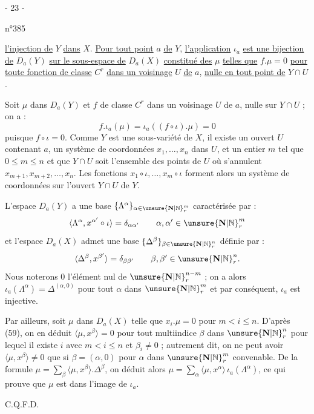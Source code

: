 \begin{center}- 23 -\end{center}
\begin{flushright}n°385\end{flushright}

\uline{l'injection de} $Y$ \uline{dans} $X$. \uline{Pour tout point} $a$ \uline{de} $Y$, \uline{l'application} $\iota_a$ \uline{est une bijection de} $D_a(Y)$ \uline{sur le sous-espace de} $D_a(X)$ \uline{constitué des} $\mu$ \uline{telles que} $f.\mu=0$ \uline{pour toute fonction de classe} $C^r$ \uline{dans un voisinage} $U$ \uline{de} $a$, \uline{nulle en tout point de} $Y\cap U$.

Soit $\mu$ dans $D_a(Y)$ et $f$ de classe $C^r$ dans un voisinage $U$ de $a$, nulle sur $Y\cap U$ ; on a :
\[
f.\iota_a(\mu)=\iota_a((f\circ\iota).\mu)=0
\]
puisque $f\circ\iota=0$. Comme $Y$ est une sous-variété de $X$, il existe un ouvert $U$ contenant $a$, un système de coordonnées $x_1,\ldots,x_n$ dans $U$, et un entier $m$ tel que $0\leq m\leq n$ et que $Y\cap U$ soit l'ensemble des points de $U$ où s'annulent $x_{m+1},x_{m+2},\ldots,x_n$. Les fonctions $x_1\circ\iota,\ldots,x_m\circ\iota$ forment alors un système de coordonnées sur l'ouvert $Y\cap U$ de $Y$.

L'espace $D_a(Y)$ a une base $\{\Lambda^\alpha\}_{\alpha\in\unsure{\mathbf{N}|\mathbb{N}}_r^m}$ caractérisée par :
\[
\langle\Lambda^\alpha,x^{\alpha'}\circ\iota\rangle=\delta_{\alpha\alpha'}
\qquad \alpha,\alpha'\in\unsure{\mathbf{N}|\mathbb{N}}_r^m
\]
et l'espace $D_a(X)$ admet une base $\{\Delta^\beta\}_{\beta\in\unsure{\mathbf{N}|\mathbb{N}}_r^n}$ définie par :
\[
\langle\Delta^\beta,x^{\beta'}\rangle=\delta_{\beta\beta'}
\qquad \beta,\beta'\in\unsure{\mathbf{N}|\mathbb{N}}_r^n.
\]
Nous noterons $0$ l'élément nul de $\unsure{\mathbf{N}|\mathbb{N}}_r^{n-m}$ ; on a alors $\iota_a(\Lambda^\alpha)=\Delta^{(\alpha,0)}$ pour tout $\alpha$ dans $\unsure{\mathbf{N}|\mathbb{N}}_r^m$ et par conséquent, $\iota_a$ est injective.

Par ailleurs, soit $\mu$ dans $D_a(X)$ telle que $x_i.\mu=0$ pour $m<i\leq n$. D'après (59), on en déduit $\langle\mu,x^\beta\rangle=0$ pour tout multiindice $\beta$ dans $\unsure{\mathbf{N}|\mathbb{N}}_r^n$ pour lequel il existe $i$ avec $m<i\leq n$ et $\beta_i\neq0$ ; autrement dit, on ne peut avoir $\langle\mu,x^\beta\rangle\neq0$ que si $\beta=(\alpha,0)$ pour $\alpha$ dans $\unsure{\mathbf{N}|\mathbb{N}}_r^m$ convenable. De la formule $\mu=\sum_\beta\langle\mu,x^\beta\rangle.\Delta^\beta$, on déduit alors $\mu=\sum_\alpha\langle\mu,x^\alpha\rangle\,\iota_a(\Lambda^\alpha)$, ce qui prouve que $\mu$ est dans l'image de $\iota_a$.
\begin{flushright}C.Q.F.D.\end{flushright}

